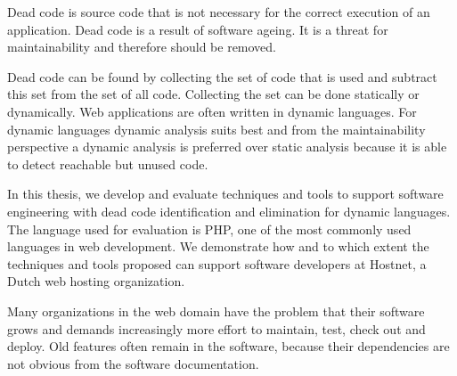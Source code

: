 \fontsize{9}{11}
\selectfont
Dead code is source code that is not necessary for the correct execution of an application. Dead code is a result of software ageing. It is a threat for maintainability and therefore should be removed. 

Dead code can be found by collecting the set of code that is used and subtract this set from the set of all code. Collecting the set can be done statically or dynamically. Web applications are often written in dynamic languages. For dynamic languages dynamic analysis suits best and from the maintainability perspective a dynamic analysis is preferred over static analysis because it is able to detect reachable but unused code.


In this thesis, we develop and evaluate techniques and tools to support software engineering with dead code identification and elimination for dynamic languages. The language used for evaluation is PHP, one of the most commonly used languages in web development. We demonstrate how and to which extent the techniques and tools proposed can support software developers at Hostnet, a Dutch web hosting organization.

Many organizations in the web domain have the problem that their software grows and demands increasingly more effort to maintain, test, check out and deploy. Old features often remain in the software, because their dependencies are not obvious from the software documentation.

\normalsize